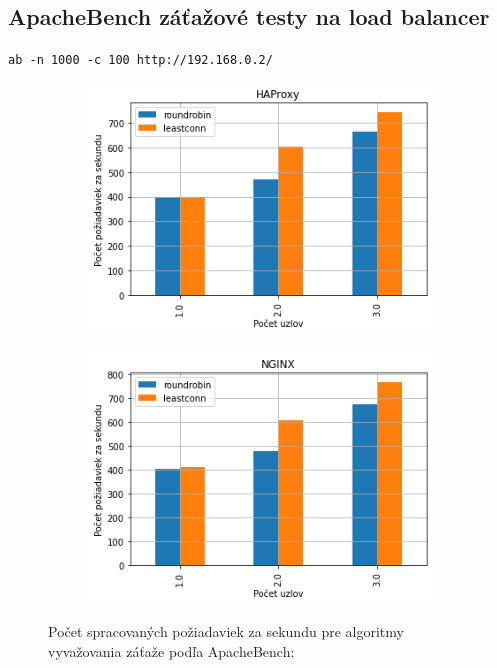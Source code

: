 \documentclass[12pt, a4paper]{article}
\begin{document}
\subsection{ApacheBench záťažové testy na load balancer}
\begin{lrbox}{\shield}
\verb|ab -n 1000 -c 100 http://192.168.0.2/|
\end{lrbox}
\begin{figure}[h!]
	\centering
	\begin{subfigure}[t]{.48\textwidth}
  		\centering
  		\includegraphics[width=\textwidth]{images/haproxy_ab_1000_100_requests.png}
	\end{subfigure}
	\begin{subfigure}[t]{.48\textwidth}
  		\centering
  		\includegraphics[width=\textwidth]{images/nginx_ab_1000_100_requests.png}
	\end{subfigure}
	\caption{Počet spracovaných požiadaviek za sekundu pre algoritmy vyvažovania 
	záťaže podľa ApacheBench: \usebox{\shield}}
\end{figure}
\end{document}
